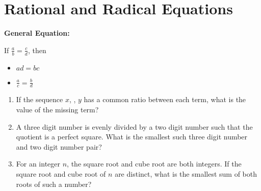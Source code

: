 \section[Rational \& Radical]{Rational and Radical Equations}

\bigskip
\textbf{General Equation:}

\bigskip
If $\frac{a}{b}=\frac{c}{d}$, then

\bigskip
\begin{itemize}[label=$\bullet$]
\item $ad=bc$

\bigskip
\item $\frac{a}{c}=\frac{b}{d}$
\end{itemize}

\vfill
\begin{enumerate}[labelindent=*,style=multiline,leftmargin=*,label=\textbf{Example \arabic*:}]
\item If the sequence $x$, \shortline, $y$ has a common ratio between each term, what is the value of the missing term?

\vfill\item A three digit number is evenly divided by a two digit number such that the quotient is a perfect square. What is the smallest such three digit number and two digit number pair?

\vfill\item For an integer $n$, the square root and cube root are both integers. If the square root and cube root of $n$ are distinct, what is the smallest sum of both roots of such a number?
\end{enumerate}

